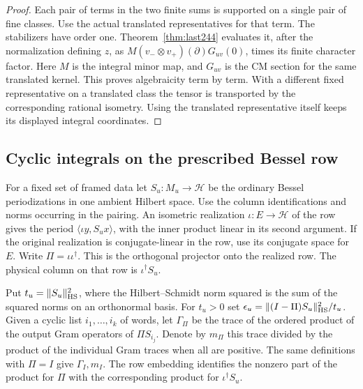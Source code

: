 \documentclass[a4paper,11pt]{article}
\theoremstyle{definition}
\theoremstyle{remark}
\numberwithin{equation}{section}
\begin{document}
\begin{proof}
Each pair of terms in the two finite sums is supported on a
single pair of fine classes. Use the actual translated
representatives for that term. The stabilizers have order
one. Theorem~\ref{thm:last244} evaluates it, after the
normalization defining \(z\), as
\(M(v_-\otimes v_+)(\partial)G_{uv}(0)\), times its finite
character factor. Here \(M\) is the integral minor map, and
\(G_{uv}\) is the CM section for the same translated kernel.
This proves algebraicity term by term. With a different fixed
representative on a translated class the tensor is transported
by the corresponding rational isometry. Using the translated
representative itself keeps its displayed integral coordinates.
\end{proof}

\subsection{Cyclic integrals on the prescribed Bessel row}\label{nav:VII-66}
For a fixed set of framed data let \(S_u:M_u\to\mathcal H\)
be the ordinary Bessel periodizations in one ambient Hilbert
space. Use the column identifications and norms occurring
in the pairing. An isometric realization
\(\iota:E\to\mathcal H\) of the row gives the period
\(\langle\iota y,S_u x\rangle\), with the inner product
linear in its second argument. If the original realization
is conjugate-linear in the row, use its conjugate space
for \(E\). Write \(\Pi=\iota\iota^\dagger\). This is the
orthogonal projector onto the realized row. The physical
column on that row is \(\iota^\dagger S_u\).

Put \(t_u=\|S_u\|_{\rm HS}^2\), where the Hilbert--Schmidt
norm squared is the sum of the squared norms on an
orthonormal basis. For \(t_u>0\) set
\(\epsilon_u=\|(I-\Pi)S_u\|_{\rm HS}^2/t_u\).
Given a cyclic list \(i_1,\ldots,i_k\) of words, let
\(\Gamma_\Pi\) be the trace of the ordered product of the
output Gram operators of \(\Pi S_{i_j}\). Denote by
\(m_\Pi\) this trace divided by the product of the individual
Gram traces when all are positive. The same definitions
with \(\Pi=I\) give \(\Gamma_I,m_I\). The row embedding
identifies the nonzero part of the product for \(\Pi\)
with the corresponding product for \(\iota^\dagger S_u\).
\end{document}
